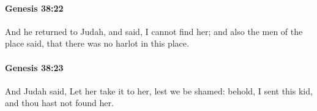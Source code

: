 		\paragraph{Genesis 38:22} %
			\label{GENESIS-38-22}

			And he returned to Judah, and said, I cannot find her; and also the men of the place said, that there was no harlot in this place.


		\paragraph{Genesis 38:23} %
			\label{GENESIS-38-23}

			And Judah said, Let her take it to her, lest we be shamed: behold, I sent this kid, and thou hast not found her.


